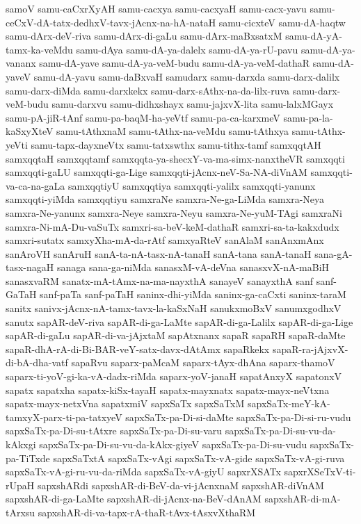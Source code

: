 {samoV
samu-caCxrXyAH
samu-cacxya
samu-cacxyaH
samu-cacx-yavu
samu-ceCxV-dA-tatx-dedhxV-tavx-jAcnx-na-hA-nataH
samu-cicxteV
samu-dA-haqtw
samu-dArx-deV-riva
samu-dArx-di-gaLu
samu-dArx-maBxsatxM
samu-dA-yA-tamx-ka-veMdu
samu-dAya
samu-dA-ya-dalelx
samu-dA-ya-rU-pavu
samu-dA-ya-vananx
samu-dA-yave
samu-dA-ya-veM-budu
samu-dA-ya-veM-dathaR
samu-dA-yaveV
samu-dA-yavu
samu-daBxvaH
samudarx
samu-darxda
samu-darx-dalilx
samu-darx-diMda
samu-darxkekx
samu-darx-sAthx-na-da-lilx-ruva
samu-darx-veM-budu
samu-darxvu
samu-didhxshayx
samu-jajxvX-lita
samu-lalxMGayx
samu-pA-jiR-tAnf
samu-pa-baqM-ha-yeVtf
samu-pa-ca-karxmeV
samu-pa-la-kaSxyXteV
samu-tAthxnaM
samu-tAthx-na-veMdu
samu-tAthxya
samu-tAthx-yeVti
samu-tapx-dayxneVtx
samu-tatxswthx
samu-tithx-tamf
samxqqtAH
samxqqtaH
samxqqtamf
samxqqta-ya-shecxY-va-ma-simx-nanxtheVR
samxqqti
samxqqti-gaLU
samxqqti-ga-Lige
samxqqti-jAcnx-neV-Sa-NA-diVnAM
samxqqti-va-ca-na-gaLa
samxqqtiyU
samxqqtiya
samxqqti-yalilx
samxqqti-yanunx
samxqqti-yiMda
samxqqtiyu
samxraNe
samxra-Ne-ga-LiMda
samxra-Neya
samxra-Ne-yanunx
samxra-Neye
samxra-Neyu
samxra-Ne-yuM-TAgi
samxraNi
samxra-Ni-mA-Du-vaSuTx
samxri-sa-beV-keM-dathaR
samxri-sa-ta-kakxdudx
samxri-sutatx
samxyXha-mA-da-rAtf
samxyaRteV
sanAlaM
sanAnxmAnx
sanAroVH
sanAruH
sanA-ta-nA-tasx-nA-tanaH
sanA-tana
sanA-tanaH
sana-gA-tasx-nagaH
sanaga
sana-ga-niMda
sanasxM-vA-deVna
sanasxvX-nA-maBiH
sanasxvaRM
sanatx-mA-tAmx-na-ma-nayxthA
sanayeV
sanayxthA
sanf
sanf-GaTaH
sanf-paTa
sanf-paTaH
saninx-dhi-yiMda
saninx-ga-caCxti
saninx-taraM
sanitx
sanivx-jAcnx-nA-tamx-tavx-la-kaSxNaH
sanukxmoBxV
sanumxgodhxV
sanutx
sapAR-deV-riva
sapAR-di-ga-LaMte
sapAR-di-ga-Lalilx
sapAR-di-ga-Lige
sapAR-di-gaLu
sapAR-di-va-jAjxtaM
sapAtxnanx
sapaR
sapaRH
sapaR-daMte
sapaR-dhA-rA-di-Bi-BAR-veY-satx-davx-dAtAmx
sapaRkekx
sapaR-ra-jAjxvX-di-bA-dha-vatf
sapaRvu
saparx-paMcaM
saparx-tAyx-dhAna
saparx-thamoV
saparx-ti-yoV-gi-ka-vA-dadx-riMda
saparx-yoV-janaH
sapatAnxyX
sapatonxV
sapatx
sapatxha
sapatx-kiSx-tayaH
sapatx-mayxnatx
sapatx-mayx-neVtxna
sapatx-mayx-netxVna
sapatxmiV
sapxSaTx
sapxSaTxM
sapxSaTx-meY-kA-tamxyX-parx-ti-pa-tatxyeV
sapxSaTx-pa-Di-si-daMte
sapxSaTx-pa-Di-si-ru-vudu
sapxSaTx-pa-Di-su-tAtxre
sapxSaTx-pa-Di-su-varu
sapxSaTx-pa-Di-su-vu-da-kAkxgi
sapxSaTx-pa-Di-su-vu-da-kAkx-giyeV
sapxSaTx-pa-Di-su-vudu
sapxSaTx-pa-TiTxde
sapxSaTxtA
sapxSaTx-vAgi
sapxSaTx-vA-gide
sapxSaTx-vA-gi-ruva
sapxSaTx-vA-gi-ru-vu-da-riMda
sapxSaTx-vA-giyU
sapxrXSATx
sapxrXSeTxV-ti-rUpaH
sapxshARdi
sapxshAR-di-BeV-da-vi-jAcnxnaM
sapxshAR-diVnAM
sapxshAR-di-ga-LaMte
sapxshAR-di-jAcnx-na-BeV-dAnAM
sapxshAR-di-mA-tArxsu
sapxshAR-di-va-tapx-rA-thaR-tAvx-tAsxvXthaRM
}
